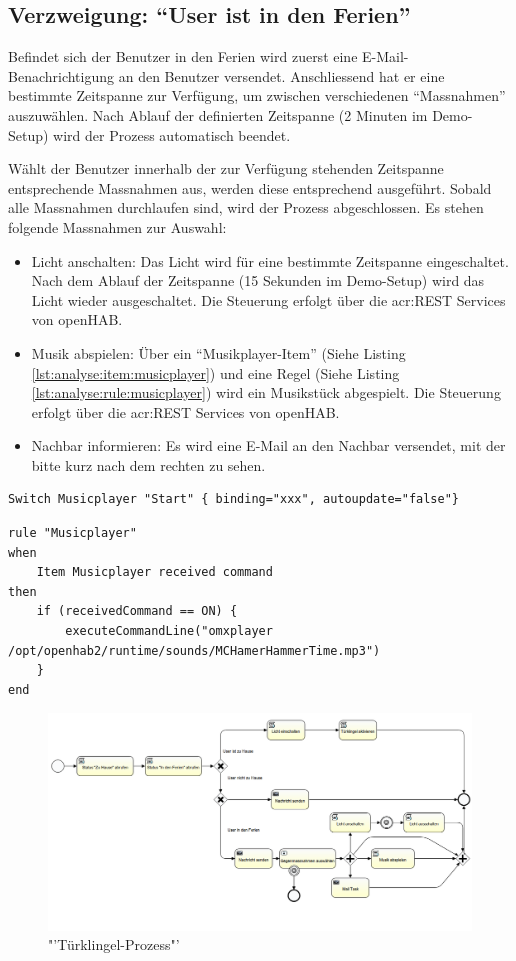 \subsection{Verzweigung: "`User ist in den Ferien"'}
Befindet sich der Benutzer in den Ferien wird zuerst eine E-Mail-Benachrichtigung an den Benutzer versendet. Anschliessend hat er eine bestimmte Zeitspanne zur Verfügung, um zwischen verschiedenen "`Massnahmen"' auszuwählen. Nach Ablauf der definierten Zeitspanne (2 Minuten im Demo-Setup) wird der Prozess automatisch beendet.

Wählt der Benutzer innerhalb der zur Verfügung stehenden Zeitspanne entsprechende Massnahmen aus, werden diese entsprechend ausgeführt. Sobald alle Massnahmen durchlaufen sind, wird der Prozess abgeschlossen. Es stehen folgende Massnahmen zur Auswahl:

\begin{itemize}
\item Licht anschalten: Das Licht wird für eine bestimmte Zeitspanne eingeschaltet. Nach dem Ablauf der Zeitspanne (15 Sekunden im Demo-Setup) wird das Licht wieder ausgeschaltet. Die Steuerung erfolgt über die \gls{acr:REST} Services von openHAB.
\item Musik abspielen: Über ein "`Musikplayer-Item"' (Siehe Listing \ref{lst:analyse:item:musicplayer}) und eine Regel (Siehe Listing \ref{lst:analyse:rule:musicplayer}) wird ein Musikstück abgespielt. Die Steuerung erfolgt über die \gls{acr:REST} Services von openHAB.
\item Nachbar informieren: Es wird eine E-Mail an den Nachbar versendet, mit der bitte kurz nach dem rechten zu sehen.
\end{itemize}

\begin{lstlisting}[caption={Item-Definition für den "`Virtuellen Musikplayer"'},label={lst:analyse:item:musicplayer}]
Switch Musicplayer "Start" { binding="xxx", autoupdate="false"}
\end{lstlisting}


\begin{lstlisting}[caption={Item-Regel für den "`Virtuellen Musikplayer"'},label={lst:analyse:rule:musicplayer}]
rule "Musicplayer"
when
	Item Musicplayer received command
then
	if (receivedCommand == ON) {
		executeCommandLine("omxplayer /opt/openhab2/runtime/sounds/MCHamerHammerTime.mp3")
	}
end
\end{lstlisting}

\newpage
\begin{landscape}
\begin{figure}[H]
  \centering
  \includegraphics[width=21cm]{./images/DoorBellProcess}
  \caption{"'Türklingel-Prozess"'}\label{img:AnalyseRpi:DoorbellProcess}
\end{figure}
\end{landscape}
